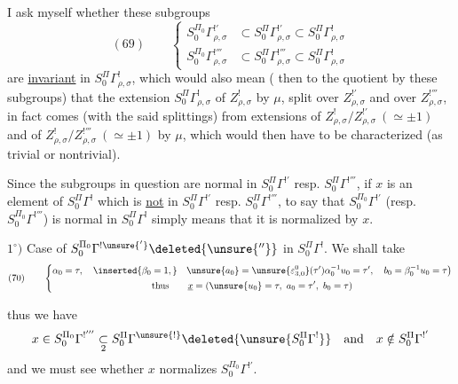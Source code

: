 
I ask myself whether these subgroups
\[
(69)\qquad
\left\{
\begin{aligned}
S_0^{\Pi_0}\Gamma_{\rho,\sigma}^{!'}&\subset S_0^{\Pi}\Gamma_{\rho,\sigma}^{!'}\subset S_0^{\Pi}\Gamma_{\rho,\sigma}^{!}\\
S_0^{\Pi_0}\Gamma_{\rho,\sigma}^{!'''}&\subset S_0^{\Pi}\Gamma_{\rho,\sigma}^{!'''}\subset S_0^{\Pi}\Gamma_{\rho,\sigma}^{!}
\end{aligned}
\right.
\]
are \uline{invariant} in $S_0^{\Pi}\Gamma_{\rho,\sigma}^{!}$, which
would also mean ( then to the quotient by these subgroups)
that the extension $S_0^{\Pi}\Gamma_{\rho,\sigma}^{!}$ of $Z_{\rho,\sigma}^{!}$
by $\mu$, split over $Z_{\rho,\sigma}^{!'}$ and over $Z_{\rho,\sigma}^{!'''}$,
in fact comes (with the said splittings) from extensions of
$Z_{\rho,\sigma}^{!}/Z_{\rho,\sigma}^{!'}\ (\simeq\pm1)$ and of
$Z_{\rho,\sigma}^{!}/Z_{\rho,\sigma}^{!'''}\ (\simeq\pm1)$ by $\mu$,
which would then have to be characterized (as trivial or nontrivial).

Since the subgroups in question are normal in
$S_0^{\Pi}\Gamma^{!'}$ resp. $S_0^{\Pi}\Gamma^{!'''}$, 
if $x$ is an element of $S_0^{\Pi}\Gamma^{!}$ which is
\uline{not} in $S_0^{\Pi}\Gamma^{!'}$ resp. $S_0^{\Pi}\Gamma^{!'''}$,
to say that $S_0^{\Pi_0}\Gamma^{!'}$ (resp. $S_0^{\Pi_0}\Gamma^{!'''}$)
is normal in $S_0^{\Pi}\Gamma^{!}$  simply means
that it is normalized by $x$.

$1^\circ)$ Case of $S_0^{\Pi_0}\Gamma^{!\unsure{'}}\deleted{\unsure{''}}$
in $S_0^{\Pi}\Gamma^{!}$. We shall take
\[
(70)\qquad
\left\{
\begin{gathered}
\alpha_0=\tau,\quad \inserted{\beta_0=1,}\quad
\unsure{a_0}=\unsure{\varepsilon^0_{3,0}}(\tau')\alpha_0^{-1}u_0=\tau',
\quad b_0=\beta_0^{-1}u_0=\tau\big)\\
\text{thus}\qquad
\underline{x}=(\unsure{u_0}=\tau,\ a_0=\tau',\ b_0=\tau)
\end{gathered}
\right.
\]



thus we have
\[
x\in S_0^{\Pi_0}\Gamma^{!'''}
\underset{2}{\subset}S_0^{\Pi}\Gamma^{\unsure{!}}
\deleted{\unsure{S_0^{\Pi}\Gamma^{!}}}
\quad\text{and}\quad x\notin S_0^{\Pi}\Gamma^{!'}
\]
and we must see whether $x$ normalizes $S_0^{\Pi_0}\Gamma^{!'}$.


